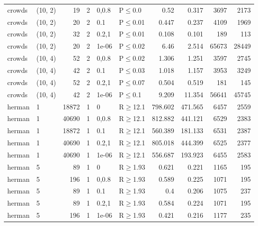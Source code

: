 \begin{longtable}{llrrllrrrr}
 crowds        & (10, 2)  &     	19 &   2 & 0,0.8 & P$\leq$0.0   & 0.52     & 0.317   & 3697    & 2173    \\
 crowds        & (10, 2)  &     	20 &   2 & 0.1   & P$\leq$0.01  & 0.447    & 0.237   & 4109    & 1969    \\
 crowds        & (10, 2)  &     	32 &   2 & 0.2,1 & P$\leq$0.01  & 0.108    & 0.101   & 189     & 113     \\
 crowds        & (10, 2)  &     	20 &   2 & 1e-06 & P$\leq$0.02  & 6.46     & 2.514   & 65673   & 28449   \\
 crowds        & (10, 4)  &     	52 &   2 & 0,0.8 & P$\leq$0.02  & 1.306    & 1.251   & 3597    & 2745    \\
 crowds        & (10, 4)  &     	42 &   2 & 0.1   & P$\leq$0.03  & 1.018    & 1.157   & 3953    & 3249    \\
 crowds        & (10, 4)  &     	52 &   2 & 0.2,1 & P$\leq$0.07  & 0.504    & 0.519   & 181     & 145     \\
 crowds        & (10, 4)  &     	42 &   2 & 1e-06 & P$\leq$0.1   & 9.209    & 11.354  & 56641   & 45745   \\
 herman        & 1        &  	18872 &   1 & 0     & R$\geq$12.1  & 798.602  & 471.565 & 6457    & 2559    \\
 herman        & 1        &  	40690 &   1 & 0,0.8 & R$\geq$12.1  & 812.882  & 441.121 & 6529    & 2383    \\
 herman        & 1        &  	18872 &   1 & 0.1   & R$\geq$12.1  & 560.389  & 181.133 & 6531    & 2387    \\
 herman        & 1        &  	40690 &   1 & 0.2,1 & R$\geq$12.1  & 805.018  & 444.399 & 6525    & 2377    \\
 herman        & 1        &  	40690 &   1 & 1e-06 & R$\geq$12.1  & 556.687  & 193.923 & 6455    & 2583    \\
 herman        & 5        &     	89 &   1 & 0     & R$\geq$1.93  & 0.621    & 0.221   & 1165    & 195     \\
 herman        & 5        &    	196 &   1 & 0,0.8 & R$\geq$1.93  & 0.589    & 0.225   & 1071    & 195     \\
 herman        & 5        &     	89 &   1 & 0.1   & R$\geq$1.93  & 0.4      & 0.206   & 1075    & 237     \\
 herman        & 5        &     	89 &   1 & 0.2,1 & R$\geq$1.93  & 0.584    & 0.224   & 1071    & 195     \\
 herman        & 5        &    	196 &   1 & 1e-06 & R$\geq$1.93  & 0.421    & 0.216   & 1177    & 235     \\

\end{longtable}
